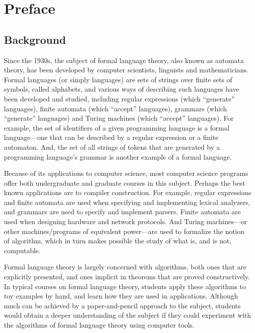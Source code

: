 \chapter*{Preface}

\section*{Background}
\label{Background}

Since the 1930s, the subject of formal language theory, also known as
automata theory, has been developed by computer scientists, linguists
and mathematicians.  Formal languages (or simply languages) are sets
of strings over finite sets of symbols, called alphabets, and various
ways of describing such languages have been developed and studied,
including regular expressions (which ``generate'' languages), finite
automata (which ``accept'' languages), grammars (which ``generate''
languages) and Turing machines (which ``accept'' languages).  For
example, the set of identifiers of a given programming language is a
formal language---one that can be described by a regular expression or
a finite automaton.  And, the set of all strings of tokens that are
generated by a programming language's grammar is another example of a
formal language.

Because of its applications to computer science, most computer science
programs offer both undergraduate and graduate courses in this
subject.  Perhaps the best known applications are to compiler
construction.  For example, regular expressions and finite automata
are used when specifying and implementing lexical analyzers, and
grammars are used to specify and implement parsers.  Finite automata
are used when designing hardware and network protocols.  And Turing
machines---or other machines/programs of equivalent power---are used
to formalize the notion of algorithm, which in turn makes possible the
study of what is, and is not, computable.

Formal language theory is largely concerned with algorithms, both ones
that are explicitly presented, and ones implicit in theorems that are
proved constructively.  In typical courses on formal language theory,
students apply these algorithms to toy examples by hand, and learn how
they are used in applications.  Although much can be achieved by a
paper-and-pencil approach to the subject, students would obtain a
deeper understanding of the subject if they could experiment with the
algorithms of formal language theory using computer tools.

